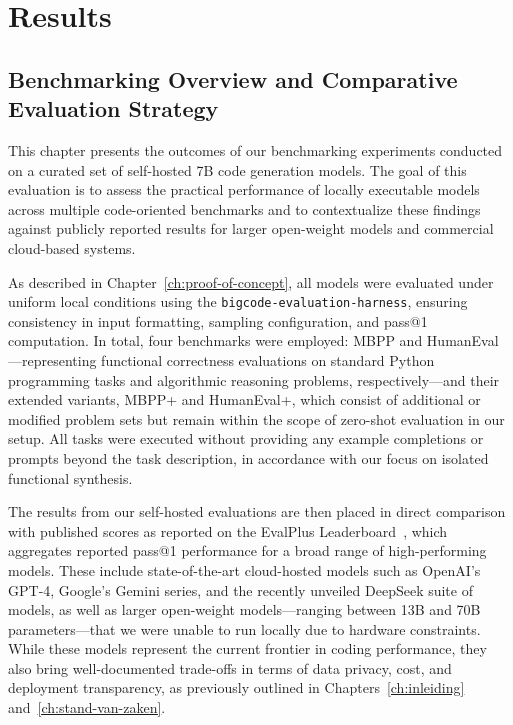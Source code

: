 \chapter{Results}
\label{ch:results}

\section{Benchmarking Overview and Comparative Evaluation Strategy}

This chapter presents the outcomes of our benchmarking experiments conducted on a curated set of self-hosted 7B code generation models. The goal of this evaluation is to assess the practical performance of locally executable models across multiple code-oriented benchmarks and to contextualize these findings against publicly reported results for larger open-weight models and commercial cloud-based systems.

As described in Chapter~\ref{ch:proof-of-concept}, all models were evaluated under uniform local conditions using the \texttt{bigcode-evaluation-harness}, ensuring consistency in input formatting, sampling configuration, and pass@1 computation. In total, four benchmarks were employed: MBPP and HumanEval---representing functional correctness evaluations on standard Python programming tasks and algorithmic reasoning problems, respectively---and their extended variants, MBPP+ and HumanEval+, which consist of additional or modified problem sets but remain within the scope of zero-shot evaluation in our setup. All tasks were executed without providing any example completions or prompts beyond the task description, in accordance with our focus on isolated functional synthesis.

The results from our self-hosted evaluations are then placed in direct comparison with published scores as reported on the EvalPlus Leaderboard~\autocite{evalplus_leaderboard}, which aggregates reported pass@1 performance for a broad range of high-performing models. These include state-of-the-art cloud-hosted models such as OpenAI’s GPT-4, Google’s Gemini series, and the recently unveiled DeepSeek suite of models, as well as larger open-weight models---ranging between 13B and 70B parameters---that we were unable to run locally due to hardware constraints. While these models represent the current frontier in coding performance, they also bring well-documented trade-offs in terms of data privacy, cost, and deployment transparency, as previously outlined in Chapters~\ref{ch:inleiding} and~\ref{ch:stand-van-zaken}.

